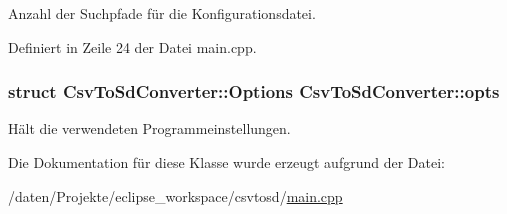 Anzahl der Suchpfade für die Konfigurationsdatei. 



Definiert in Zeile 24 der Datei main.\-cpp.

\hypertarget{classCsvToSdConverter_aed83889861a110c9913adb5b9f4d9eb3}{
\subsubsection[{opts}]{\setlength{\rightskip}{0pt plus 5cm}struct {\bf Csv\-To\-Sd\-Converter\-::\-Options}  Csv\-To\-Sd\-Converter\-::opts\hspace{0.3cm}{\ttfamily [protected]}}}\label{classCsvToSdConverter_aed83889861a110c9913adb5b9f4d9eb3}


Hält die verwendeten Programmeinstellungen. 



Die Dokumentation für diese Klasse wurde erzeugt aufgrund der Datei\-:\begin{DoxyCompactItemize}
\item 
/daten/\-Projekte/eclipse\-\_\-workspace/csvtosd/\hyperlink{csvtosd_2main_8cpp}{main.\-cpp}\end{DoxyCompactItemize}
